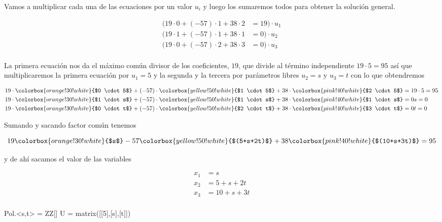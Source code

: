 \documentclass{amsart}
\begin{document}
Vamos a multiplicar cada una de las ecuaciones por un valor $u_i$ y luego
los sumaremos todos para obtener la solución general. 

\begin{align*}
\Big( 19 \cdot 0 + (-57) \cdot 1 + 38 \cdot 2 &= 19 \Big) \cdot u_1 \\
\Big( 19 \cdot 1 + (-57) \cdot 1 + 38 \cdot 1 &= 0 \Big) \cdot u_2 \\
\Big( 19 \cdot 0 + (-57) \cdot 2 + 38 \cdot 3 &= 0 \Big) \cdot u_3 \\
\end{align*}

La primera ecuación nos da el máximo común divisor de los coeficientes, $19$,
que divide al término independiente $19 \cdot 5 = 95$ así que multiplicaremos
la primera ecuación por $u_1 = 5$ y la segunda y la tercera por parámetros 
libres $u_2 = s$ y $u_3 = t$ con lo que obtendremos

\begin{align*}
19 \cdot \colorbox{orange!30!white}{$0 \cdot 5$} + (-57) \cdot \colorbox{yellow!50!white}{$1 \cdot 5$} + 38 \cdot \colorbox{pink!40!white}{$2 \cdot 5$} &= 19 \cdot 5 = 95 \\
19 \cdot \colorbox{orange!30!white}{$1 \cdot s$} + (-57) \cdot \colorbox{yellow!50!white}{$1 \cdot s$} + 38 \cdot \colorbox{pink!40!white}{$1 \cdot s$} &= 0s = 0 \\
19 \cdot \colorbox{orange!30!white}{$0 \cdot t$} + (-57) \cdot \colorbox{yellow!50!white}{$2 \cdot t$} + 38 \cdot \colorbox{pink!40!white}{$3 \cdot t$} &= 0t = 0 \\
\end{align*}

Sumando y sacando factor común tenemos 

$$ 19 \colorbox{orange!30!white}{$s$} -57 \colorbox{yellow!50!white}{$(5+s+2t)$} + 38 \colorbox{pink!40!white}{$(10+s+3t)$} = 95$$

y de ahí sacamos el valor de las variables

\begin{align*}
x_1 &= s \\
x_2 &= 5+s+2t \\
x_3 &= 10+s+3t \\
\end{align*}


\begin{sageblock}
Pol.<s,t> = ZZ[]
U = matrix([[5],[s],[t]])
\end{sageblock}
\end{document}
